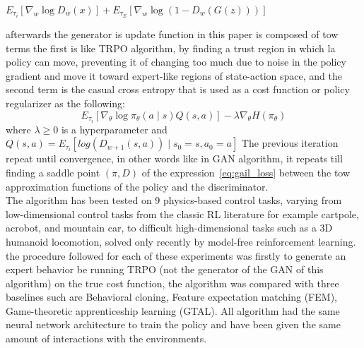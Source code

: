 \begin{center}
	$E_{\tau_i}[\nabla_w\log{D_w(x)}] + E_{\tau_E}[\nabla_w\log{(1-D_w(G(z)))}]$
\end{center}
afterwards the generator is update function in this paper is composed of tow terms the first is like TRPO algorithm, by finding a trust region in which la policy can move, preventing it of changing too much due to noise in the policy gradient and move it toward expert-like regions of state-action space, and the second term is the casual cross entropy that is used as a cost function or policy regularizer as the following:
\begin{equation}
E_{\tau_i}[\nabla_{\theta}\log{\pi_{\theta}(a \mid s)}Q(s,a)] - \lambda \nabla_{\theta} H(\pi_{\theta})
\label{eq:gail_loss}
\end{equation}
where $\lambda \geqslant 0$ is a hyperparameter and $Q(s,a) = E_{\tau_i}[log{(D_{w+1}(s,a))} \mid s_0=s,a_0 = a]$
The previous iteration repeat until convergence, in other words like in GAN algorithm, it repeats till finding a saddle point $(\pi, D)$ of the expression~\ref{eq:gail_loss} between the tow approximation functions of the policy and the discriminator.\\
The algorithm has been tested on 9 physics-based control tasks, varying from low-dimensional control tasks from the classic RL literature for example cartpole, acrobot, and mountain
car, to difficult high-dimensional tasks such as a 3D humanoid locomotion, solved only recently
by model-free reinforcement learning. the procedure followed for each of these experiments was firstly to generate an expert behavior be running TRPO (not the generator of the GAN of this algorithm) on the true cost function, the algorithm was compared with three baselines such are Behavioral cloning, Feature expectation matching (FEM), Game-theoretic apprenticeship learning (GTAL). All algorithm had the same neural network architecture to train the policy and have been given the same amount of interactions with the environments.

